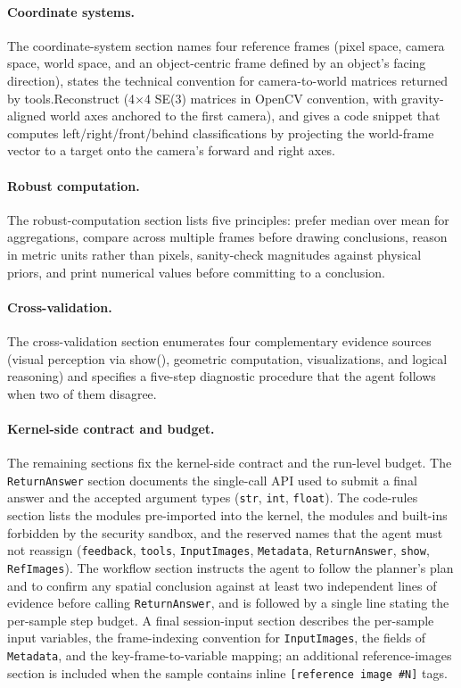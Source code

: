 \documentclass{llmxive}
\providecommand{\apicode}[1]{#1}
\begin{document}
\paragraph{Coordinate systems.}
The coordinate-system section names four reference frames (pixel space, camera space, world space, and an object-centric frame defined by an object's facing direction), states the technical convention for camera-to-world matrices returned by \apicode{tools.Reconstruct} (4$\times$4 SE(3) matrices in OpenCV convention, with gravity-aligned world axes anchored to the first camera), and gives a code snippet that computes left/right/front/behind classifications by projecting the world-frame vector to a target onto the camera's forward and right axes.

\paragraph{Robust computation.}
The robust-computation section lists five principles: prefer median over mean for aggregations, compare across multiple frames before drawing conclusions, reason in metric units rather than pixels, sanity-check magnitudes against physical priors, and print numerical values before committing to a conclusion.

\paragraph{Cross-validation.}
The cross-validation section enumerates four complementary evidence sources (visual perception via \apicode{show()}, geometric computation, visualizations, and logical reasoning) and specifies a five-step diagnostic procedure that the agent follows when two of them disagree.

\paragraph{Kernel-side contract and budget.}
The remaining sections fix the kernel-side contract and the run-level budget. The \texttt{ReturnAnswer} section documents the single-call API used to submit a final answer and the accepted argument types (\texttt{str}, \texttt{int}, \texttt{float}). The code-rules section lists the modules pre-imported into the kernel, the modules and built-ins forbidden by the security sandbox, and the reserved names that the agent must not reassign (\texttt{feedback}, \texttt{tools}, \texttt{InputImages}, \texttt{Metadata}, \texttt{ReturnAnswer}, \texttt{show}, \texttt{RefImages}). The workflow section instructs the agent to follow the planner's plan and to confirm any spatial conclusion against at least two independent lines of evidence before calling \texttt{ReturnAnswer}, and is followed by a single line stating the per-sample step budget. A final session-input section describes the per-sample input variables, the frame-indexing convention for \texttt{InputImages}, the fields of \texttt{Metadata}, and the key-frame-to-variable mapping; an additional reference-images section is included when the sample contains inline \texttt{[reference image \#N]} tags.
\end{document}
